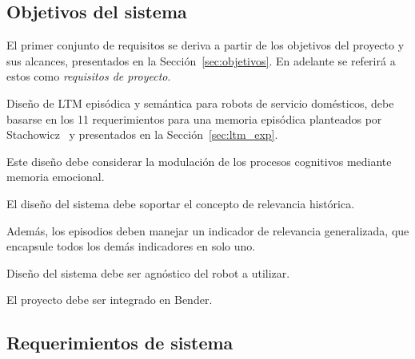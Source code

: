 \subsection{Objetivos del sistema}

El primer conjunto de requisitos se deriva a partir de los objetivos del proyecto y sus alcances, presentados en la Sección~\ref{sec:objetivos}. En adelante se referirá a estos como \textit{requisitos de proyecto}.
\begin{description}
\item {} Diseño de LTM episódica y semántica para robots de servicio domésticos, debe basarse en los 11 requerimientos para una memoria episódica planteados por Stachowicz~\cite{Stachowicz2012} y presentados en la Sección~\ref{sec:ltm_exp}.
\item {} Este diseño debe considerar la modulación de los procesos cognitivos mediante memoria emocional.
\item {} El diseño del sistema debe soportar el concepto de relevancia histórica.
\item {} Además, los episodios deben manejar un indicador de relevancia generalizada, que encapsule todos los demás indicadores en solo uno.
\item {} Diseño del sistema debe ser agnóstico del robot a utilizar.
\item {} El proyecto debe ser integrado en Bender.
\end{description}


\subsection{Requerimientos de sistema}

